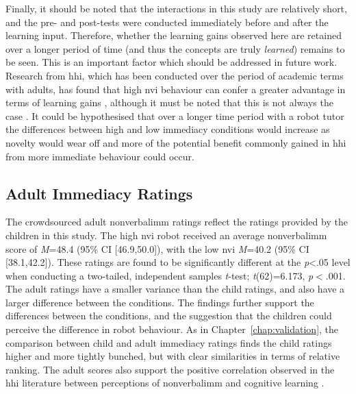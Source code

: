 Finally, it should be noted that the interactions in this study are relatively short, and the pre- and post-tests were conducted immediately before and after the \gls{learning} input. Therefore, whether the \gls{learning} gains observed here are retained over a longer period of time (and thus the concepts are truly \textit{learned}) remains to be seen. This is an important factor which should be addressed in future work. Research from \acrshort{hhi}, which has been conducted over the period of academic terms with adults, has found that high \acrshort{nvi} behaviour can confer a greater advantage in terms of \gls{learning} gains \citep{witt2004meta}, although it must be noted that this is not always the case \citep{comstock1995food}. It could be hypothesised that over a longer time period with a robot tutor the differences between high and low immediacy conditions would increase as novelty would wear off and more of the potential benefit commonly gained in \acrshort{hhi} from more immediate behaviour could occur.

\subsection{Adult Immediacy Ratings}
The crowdsourced adult \gls{nonverbalimm} ratings reflect the ratings provided by the children in this study. The high \acrshort{nvi} robot received an average \gls{nonverbalimm} score of \textit{M}=48.4 (95\% CI [46.9,50.0]), with the low \acrshort{nvi} \textit{M}=40.2 (95\% CI [38.1,42.2]). These ratings are found to be significantly different at the \textit{p}\textless .05 level when conducting a two-tailed, independent samples \textit{t}-test; \textit{t}(62)=6.173, \textit{p}$<$.001. The adult ratings have a smaller variance than the child ratings, and also have a larger difference between the conditions. The findings further support the differences between the conditions, and the suggestion that the children could perceive the difference in robot behaviour. As in Chapter~\ref{chap:validation}, the comparison between child and adult immediacy ratings finds the child ratings higher and more tightly bunched, but with clear similarities in terms of relative ranking. The adult scores also support the positive correlation observed in the \acrshort{hhi} literature between perceptions of \gls{nonverbalimm} and cognitive \gls{learning} \citep{richmond1998nonverbal}.

